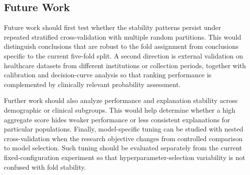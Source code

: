 \subsection{Future Work}

Future work should first test whether the stability patterns persist under repeated stratified cross-validation with multiple random partitions. This would distinguish conclusions that are robust to the fold assignment from conclusions specific to the current five-fold split. A second direction is external validation on healthcare datasets from different institutions or collection periods, together with calibration and decision-curve analysis so that ranking performance is complemented by clinically relevant probability assessment.

Further work should also analyze performance and explanation stability across demographic or clinical subgroups. This would help determine whether a high aggregate score hides weaker performance or less consistent explanations for particular populations. Finally, model-specific tuning can be studied with nested cross-validation when the research objective changes from controlled comparison to model selection. Such tuning should be evaluated separately from the current fixed-configuration experiment so that hyperparameter-selection variability is not confused with fold stability.